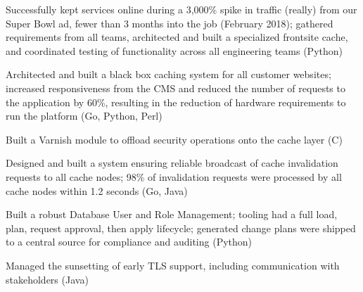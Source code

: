 %
\item Successfully kept services online during a 3,000\% spike in traffic (really) from our Super Bowl ad, fewer than 3
  months into the job (February 2018); gathered requirements from all teams, architected and built a specialized
  frontsite cache, and coordinated testing of functionality across all engineering teams (Python)

\item Architected and built a black box caching system for all customer websites; increased responsiveness from the CMS
  and reduced the number of requests to the application by 60\%, resulting in the reduction of hardware requirements to
  run the platform (Go, Python, Perl)

\item Built a Varnish module to offload security operations onto the cache layer (C)

\item Designed and built a system ensuring reliable broadcast of cache invalidation requests to all cache nodes; 98\% of
  invalidation requests were processed by all cache nodes within 1.2 seconds (Go, Java)

\item Built a robust Database User and Role Management; tooling had a full load, plan, request approval, then apply
  lifecycle; generated change plans were shipped to a central source for compliance and auditing (Python)

\item Managed the sunsetting of early TLS support, including communication with stakeholders (Java)
